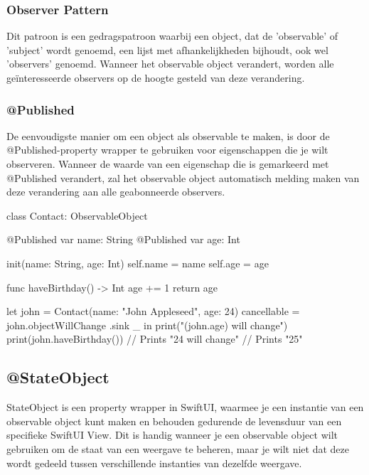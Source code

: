 \subsubsection{Observer Pattern}
\autocite{MediumDesignPatterns} Dit patroon is een gedragspatroon waarbij een object, dat de 'observable' of 'subject' wordt genoemd, een lijst met afhankelijkheden bijhoudt, ook wel 'observers' genoemd. Wanneer het observable object verandert, worden alle geïnteresseerde observers op de hoogte gesteld van deze verandering.

\subsubsection{@Published}
\autocite{ApplePublished} De eenvoudigste manier om een object als observable te maken, is door de @Published-property wrapper te gebruiken voor eigenschappen die je wilt observeren. Wanneer de waarde van een eigenschap die is gemarkeerd met @Published verandert, zal het observable object automatisch melding maken van deze verandering aan alle geabonneerde observers.

\begin{swift}[caption=Example of implemented Observable Pattern, label=observable_example]
class Contact: ObservableObject {
    @Published var name: String
    @Published var age: Int
    
    
    init(name: String, age: Int) {
        self.name = name
        self.age = age
    }
    
    
    func haveBirthday() -> Int {
        age += 1
        return age
    }
}


let john = Contact(name: "John Appleseed", age: 24)
cancellable = john.objectWillChange
.sink { _ in
    print("(john.age) will change")
}
print(john.haveBirthday())
// Prints "24 will change"
// Prints "25"
\end{swift}

\subsection{@StateObject}
StateObject is een property wrapper in SwiftUI, waarmee je een instantie van een observable object kunt maken en behouden gedurende de levensduur van een specifieke SwiftUI View. Dit is handig wanneer je een observable object wilt gebruiken om de staat van een weergave te beheren, maar je wilt niet dat deze wordt gedeeld tussen verschillende instanties van dezelfde weergave.

